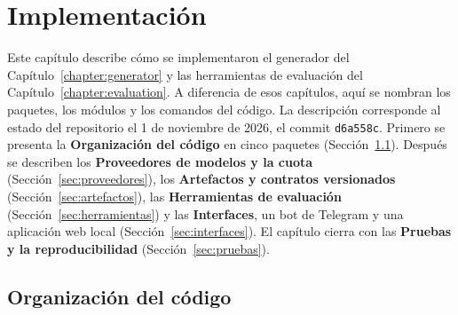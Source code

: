 \chapter{Implementación}\label{chapter:implementation}

Este capítulo describe cómo se implementaron el generador del Capítulo~\ref{chapter:generator} y
las herramientas de evaluación del Capítulo~\ref{chapter:evaluation}. A diferencia de esos
capítulos, aquí se nombran los paquetes, los módulos y los comandos del código. La descripción
corresponde al estado del repositorio el 1 de noviembre de 2026, el commit \texttt{d6a558c}. Primero
se presenta la
\textbf{Organización del código} en cinco paquetes (Sección~\ref{sec:monorepo}). Después se
describen los \textbf{Proveedores de modelos y la cuota} (Sección~\ref{sec:proveedores}), los
\textbf{Artefactos y contratos versionados} (Sección~\ref{sec:artefactos}), las \textbf{Herramientas
de evaluación} (Sección~\ref{sec:herramientas}) y las \textbf{Interfaces}, un bot de Telegram y una
aplicación web local (Sección~\ref{sec:interfaces}). El capítulo cierra con las \textbf{Pruebas y la
reproducibilidad} (Sección~\ref{sec:pruebas}).

\section{Organización del código}\label{sec:monorepo}

